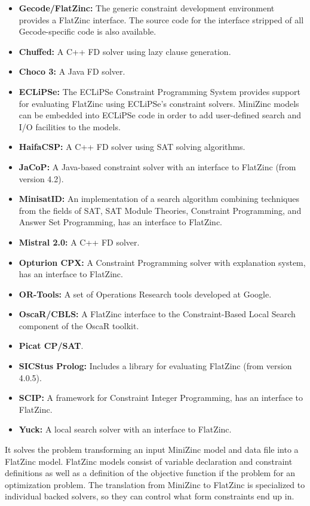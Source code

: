 \begin{itemize}
\item \textbf{Gecode/FlatZinc:} The generic constraint development environment provides a FlatZinc interface. The source code for the interface stripped of all Gecode-specific code is also available.
\item \textbf{Chuffed:} A C++ FD solver using lazy clause generation.
\item \textbf{Choco 3:} A Java FD solver.
\item \textbf{ECLiPSe:} The ECLiPSe Constraint Programming System provides support for evaluating FlatZinc using ECLiPSe's constraint solvers. MiniZinc models can be embedded into ECLiPSe code in order to add user-defined search and I/O facilities to the models.
\item \textbf{HaifaCSP:} A C++ FD solver using SAT solving algorithms.
\item \textbf{JaCoP:} A Java-based constraint solver with an interface to FlatZinc (from version 4.2).
\item \textbf{MinisatID:} An implementation of a search algorithm combining techniques from the fields of SAT, SAT Module Theories, Constraint Programming, and Answer Set Programming, has an interface to FlatZinc.
\item \textbf{Mistral 2.0:} A C++ FD solver.
\item \textbf{Opturion CPX:} A Constraint Programming solver with explanation system, has an interface to FlatZinc.
\item \textbf{OR-Tools:} A set of Operations Research tools developed at Google.
\item \textbf{OscaR/CBLS:} A FlatZinc interface to the Constraint-Based Local Search component of the OscaR toolkit.
\item \textbf{Picat CP/SAT}.
\item \textbf{SICStus Prolog:} Includes a library for evaluating FlatZinc (from version 4.0.5).
\item \textbf{SCIP:} A framework for Constraint Integer Programming, has an interface to FlatZinc.
\item \textbf{Yuck:} A local search solver with an interface to FlatZinc.
\end{itemize}

It solves the problem transforming an input MiniZinc model and data file into a FlatZinc model. FlatZinc models consist of variable declaration and constraint definitions as well as a definition of the objective function if the problem for an optimization problem. The translation from MiniZinc to FlatZinc is specialized to individual backed solvers, so they can control what form constraints end up in\cite{minizinc:2017}. 

